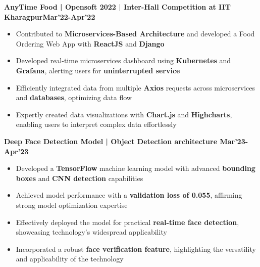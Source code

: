 \documentclass[10pt]{article}
\begin{document}
\large {\textbf{AnyTime Food | Opensoft 2022 | Inter-Hall Competition at IIT Kharagpur\normalsize{{\hfill}Mar'22-Apr'22}}} \normalsize
\\[-1.9em]
\begin{itemize}
    \item Contributed to \textbf{Microservices-Based Architecture} and developed a Food Ordering Web App with \textbf{ReactJS} and \textbf{Django}\\[-1.9em]
    \item Developed real-time microservices dashboard using \textbf{Kubernetes} and \textbf{Grafana}, alerting users for \textbf{uninterrupted service}\\[-1.9em]
    \item Efficiently integrated data from multiple \textbf{Axios} requests across microservices and \textbf{databases}, optimizing data flow\\[-1.9em]
    \item Expertly created data visualizations with \textbf{Chart.js} and \textbf{Highcharts}, enabling users to interpret complex data effortlessly\\[-1.5em]
\end{itemize}
\large {\textbf{Deep Face Detection Model | Object Detection architecture \normalsize{{\hfill}Mar'23-Apr'23}}} \normalsize
\\[-1.9em]
\begin{itemize}
    \item Developed a \textbf{TensorFlow} machine learning model with advanced \textbf{bounding boxes} and \textbf{CNN detection} capabilities\\[-1.9em]
    \item Achieved model performance with a \textbf{validation loss of 0.055}, affirming strong model optimization expertise\\[-1.9em]
    \item Effectively deployed the model for practical \textbf{real-time face detection}, showcasing technology's widespread applicability\\[-1.9em]
    \item Incorporated a robust \textbf{face verification feature}, highlighting the versatility and applicability of the technology\\[-1.5em]
\end{itemize}
\vspace{-2ex}
{\color{headliner} \spacedhrule{0.15ex}{1.0ex}}
\end{document}
